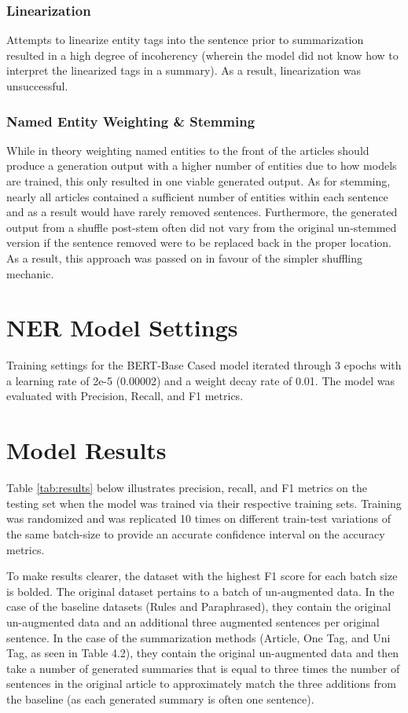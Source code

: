 \documentclass[12pt]{report}
\begin{document}
            \subsubsection{Linearization}
                Attempts to linearize entity tags into the sentence prior to summarization resulted in a high degree of incoherency (wherein the model did not know how to interpret the linearized tags in a summary). As a result, linearization was unsuccessful.
                
            \subsubsection{Named Entity Weighting \& Stemming}
                While in theory weighting named entities to the front of the articles should produce a generation output with a higher number of entities due to how models are trained, this only resulted in one viable generated output. As for stemming, nearly all articles contained a sufficient number of entities within each sentence and as a result would have rarely removed sentences. Furthermore, the generated output from a shuffle post-stem often did not vary from the original un-stemmed version if the sentence removed were to be replaced back in the proper location. As a result, this approach was passed on in favour of the simpler shuffling mechanic.
    
    \section{NER Model Settings}
        Training settings for the BERT-Base Cased model iterated through 3 epochs with a learning rate of 2e-5 (0.00002) and a weight decay rate of 0.01. The model was evaluated with Precision, Recall, and F1 metrics.


    \newpage
    \section{Model Results}
        Table \ref{tab:results} below illustrates precision, recall, and F1 metrics on the testing set when the model was trained via their respective training sets. Training was randomized and was replicated 10 times on different train-test variations of the same batch-size to provide an accurate confidence interval on the accuracy metrics.
        
        To make results clearer, the dataset with the highest F1 score for each batch size is bolded. The original dataset pertains to a batch of un-augmented data. In the case of the baseline datasets (Rules and Paraphrased), they contain the original un-augmented data and an additional three augmented sentences per original sentence. In the case of the summarization methods (Article, One Tag, and Uni Tag, as seen in Table 4.2), they contain the original un-augmented data and then take a number of generated summaries that is equal to three times the number of sentences in the original article to approximately match the three additions from the baseline (as each generated summary is often one sentence).
        
\end{document}
